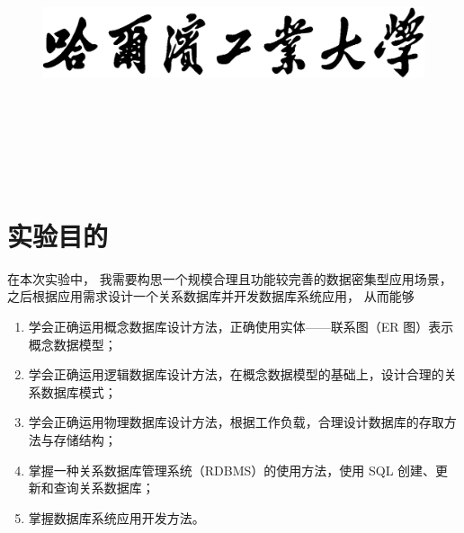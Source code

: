 \documentclass[12pt,onecolumn]{report}
\newcommand{\hei}{\CJKfamily{hei}}      %
\theoremstyle{plain}
\numberwithin{figure}{chapter}
\numberwithin{table}{chapter}
\numberwithin{lstlisting}{chapter}
\begin{document}
\begin{titlepage}
  \vspace{5\baselineskip}

  \begin{figure}[H]
    \centering
    \includegraphics[width=0.6\linewidth]{figures/school.eps}
  \end{figure}

  \centering\hei{}

  \xiaosan\vspace{\baselineskip}


  \erhao\vspace{2\baselineskip}


  \sanhao\vspace{3\baselineskip}

  ~~\underline{} \\ [24pt]
  ~~\underline{} \\ [24pt]
  ~~\underline{\makebox[160bp][s]{}} \\ [24pt]
  ~~\underline{} \\ [24pt]
  ~~\underline{} \\ [24pt]
\end{titlepage}

\clearpage
\tableofcontents
\clearpage


\chapter{实验目的}
在本次实验中，
我需要构思一个规模合理且功能较完善的数据密集型应用场景，
之后根据应用需求设计一个关系数据库并开发数据库系统应用，
从而能够
\begin{enumerate}[fullwidth,itemindent=\parindent,label=\arabic*.]
\item 学会正确运用概念数据库设计方法，正确使用实体——联系图（ER 图）表示概念数据模型；
\item 学会正确运用逻辑数据库设计方法，在概念数据模型的基础上，设计合理的关系数据库模式；
\item 学会正确运用物理数据库设计方法，根据工作负载，合理设计数据库的存取方法与存储结构；
\item 掌握一种关系数据库管理系统（RDBMS）的使用方法，使用 SQL 创建、更新和查询关系数据库；
\item 掌握数据库系统应用开发方法。
\end{enumerate}
\end{document}
